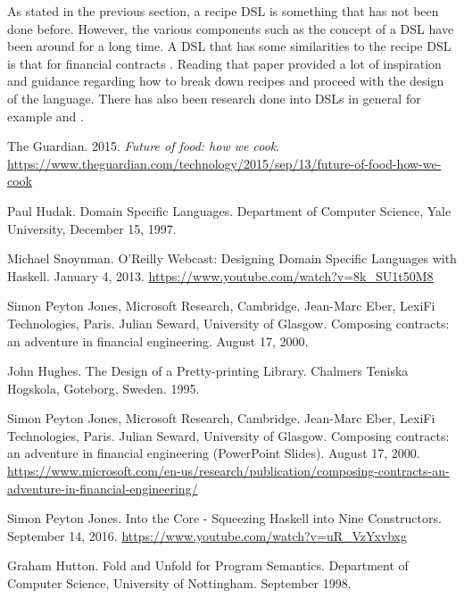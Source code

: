 \documentclass[11pt]{article}
\begin{document}
    As stated in the previous section, a recipe DSL is something that has not been done before.
    However, the various components such as the concept of a DSL have been around for a long time.
    A DSL that has some similarities to the recipe DSL is that for financial contracts \cite{contracts}.
    Reading that paper provided a lot of inspiration and guidance regarding how to break down recipes
    and proceed with the design of the language. There has also been research done into DSLs
    in general for example \cite{hudak} and \cite{snoyman}.

    \newpage
    \begin{thebibliography}{5}

        The Guardian. 2015. \textit{Future of food: how we cook}.
        \url{https://www.theguardian.com/technology/2015/sep/13/future-of-food-how-we-cook}

        Paul Hudak. Domain Specific Languages. Department of Computer
        Science, Yale University, December 15, 1997.

        Michael Snoynman. O'Reilly Webcast: Designing Domain Specific
        Languages with Haskell. January 4, 2013.
        \url{https://www.youtube.com/watch?v=8k_SU1t50M8}

        Simon Peyton Jones, Microsoft Research, Cambridge.
        Jean-Marc Eber, LexiFi Technologies, Paris. Julian Seward,
        University of Glasgow. Composing contracts: an adventure in
        financial engineering. August 17, 2000.

        John Hughes. The Design of a Pretty-printing Library.
        Chalmers Teniska Hogskola, Goteborg, Sweden. 1995.

        Simon Peyton Jones, Microsoft Research, Cambridge.
        Jean-Marc Eber, LexiFi Technologies, Paris. Julian Seward,
        University of Glasgow. Composing contracts: an adventure in
        financial engineering (PowerPoint Slides). August 17, 2000.
        \url{https://www.microsoft.com/en-us/research/publication/composing-contracts-an-adventure-in-financial-engineering/}

        Simon Peyton Jones. Into the Core - Squeezing Haskell into
        Nine Constructors. September 14, 2016.
        \url{https://www.youtube.com/watch?v=uR_VzYxvbxg}

        Graham Hutton. Fold and Unfold for Program Semantics. Department of
        Computer Science, University of Nottingham. September 1998.

    \end{thebibliography}   
\end{document}

